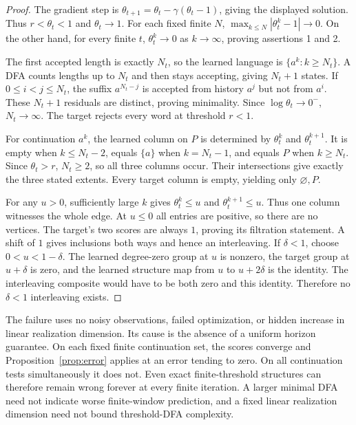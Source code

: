 \documentclass[11pt]{article}
\theoremstyle{definition}\newtheorem{definition}[theorem]{Definition}
\theoremstyle{remark}\newtheorem{remark}[theorem]{Remark}
\begin{document}
\begin{proof}
The gradient step is
$\theta_{t+1}=\theta_t-\gamma(\theta_t-1)$, giving the displayed
solution. Thus $r<\theta_t<1$ and $\theta_t\to1$. For each fixed
finite $N$, $\max_{k\leq N}|\theta_t^k-1|\to0$. On the other hand,
for every finite $t$, $\theta_t^k\to0$ as $k\to\infty$, proving
assertions 1 and 2.

The first accepted length is exactly $N_t$, so the learned language
is $\{a^k:k\geq N_t\}$. A DFA counts lengths up to $N_t$ and then
stays accepting, giving $N_t+1$ states. If $0\leq i<j\leq N_t$,
the suffix $a^{N_t-j}$ is accepted from history $a^j$ but not from
$a^i$. These $N_t+1$ residuals are distinct, proving minimality.
Since $\log\theta_t\to0^-$, $N_t\to\infty$. The target rejects
every word at threshold $r<1$.

For continuation $a^k$, the learned column on $P$ is determined by
$\theta_t^k$ and $\theta_t^{k+1}$. It is empty when
$k\leq N_t-2$, equals $\{a\}$ when $k=N_t-1$, and equals $P$
when $k\geq N_t$. Since $\theta_t>r$, $N_t\geq2$, so all three
columns occur. Their intersections give exactly the three stated
extents. Every target column is empty, yielding only
$\varnothing,P$.

For any $u>0$, sufficiently large $k$ gives
$\theta_t^k\leq u$ and $\theta_t^{k+1}\leq u$. Thus one column
witnesses the whole edge. At $u\leq0$ all entries are positive, so
there are no vertices. The target's two scores are always $1$,
proving its filtration statement. A shift of $1$ gives inclusions
both ways and hence an interleaving. If $\delta<1$, choose
$0<u<1-\delta$. The learned degree-zero group at $u$ is nonzero,
the target group at $u+\delta$ is zero, and the learned structure
map from $u$ to $u+2\delta$ is the identity. The interleaving
composite would have to be both zero and this identity. Therefore
no $\delta<1$ interleaving exists.
\end{proof}


The failure uses no noisy observations, failed optimization, or hidden
increase in linear realization dimension. Its cause is the absence of a
uniform horizon guarantee. On each fixed finite continuation set, the
scores converge and Proposition~\ref{prop:error} applies at an error
tending to zero. On all continuation tests simultaneously it does not.
Even exact finite-threshold structures can therefore remain wrong forever
at every finite iteration. A larger minimal DFA need not indicate worse
finite-window prediction, and a fixed linear realization dimension need
not bound threshold-DFA complexity.
\end{document}
